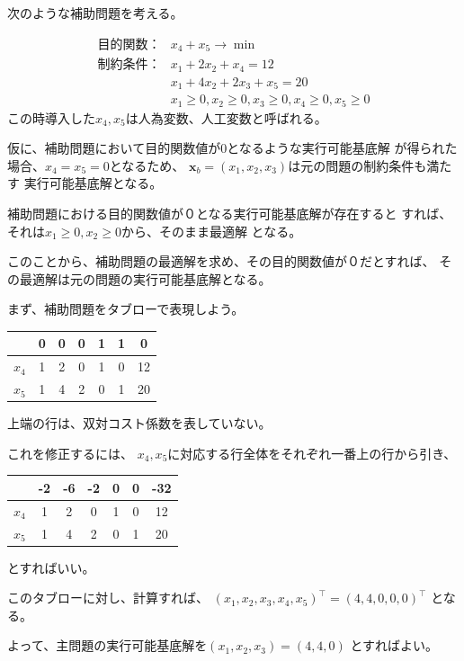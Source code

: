 \documentclass[9pt]{ltjsreport}
\begin{document}
\hrulefill

次のような補助問題を考える。

\begin{align}
    \text{目的関数：}&x_4+x_5\longrightarrow \min \\
    \text{制約条件：}&x_1+2x_2+x_4=12\\
                   &x_1+4x_2+2x_3+x_5=20\\
                   &x_1\ge 0,x_2\ge 0,x_3\ge 0,x_4\ge 0,x_5\ge 0
\end{align}
この時導入した$x_4,x_5$は人為変数、人工変数と呼ばれる。

仮に、補助問題において目的関数値が0となるような実行可能基底解
が得られた場合、$x_4=x_5=0$となるため、
$\bm{x}_b=(x_1,x_2,x_3)$は元の問題の制約条件も満たす
実行可能基底解となる。

補助問題における目的関数値が０となる実行可能基底解が存在すると
すれば、それは$x_1\ge 0,x_2\ge 0$から、そのまま最適解
となる。

このことから、補助問題の最適解を求め、その目的関数値が０だとすれば、
その最適解は元の問題の実行可能基底解となる。

まず、補助問題をタブローで表現しよう。

\begin{table}[h]
    \centering
    \begin{tabular}{cccccc|c}\toprule
        &0&0&0&1&1&0\\ \midrule
        $x_4$&1&2&0&1&0&12\\
        $x_5$&1&4&2&0&1&20 \\ \bottomrule
    \end{tabular}
\end{table}
上端の行は、双対コスト係数を表していない。

これを修正するには、
$x_4,x_5$に対応する行全体をそれぞれ一番上の行から引き、
\begin{table}[h]
    \centering
    \begin{tabular}{cccccc|c}\toprule
        &-2&-6&-2&0&0&-32\\ \midrule
        $x_4$&1&2&0&1&0&12\\
        $x_5$&1&4&2&0&1&20 \\ \bottomrule
    \end{tabular}
\end{table}
とすればいい。

このタブローに対し、計算すれば、
$(x_1,x_2,x_3,x_4,x_5)^\top =(4,4,0,0,0)^\top$
となる。

よって、主問題の実行可能基底解を$(x_1,x_2,x_3)=(4,4,0)$
とすればよい。
\end{document}

